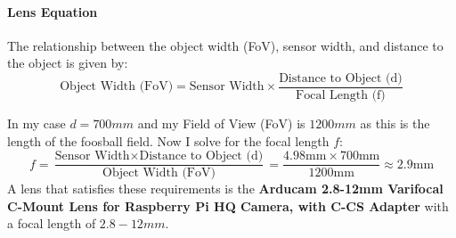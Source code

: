 \paragraph{Lens Equation}\label{par:lens_equation}

The relationship between the object width (FoV), sensor width, and distance to the object is given by:
\begin{equation}
    \text{Object Width (FoV)} = \text{Sensor Width} \times \frac{\text{Distance to Object (d)}}{\text{Focal Length (f)}}\label{eq:lens_equation}
\end{equation}


\noindent In my case $d = 700mm$ and my Field of View (FoV) is $1200mm$ as this is the length of the foosball field.
Now I solve for the focal length $f$:
\begin{equation}
    \label{eq:focal_length}
    f = \frac{\text{Sensor Width} \times \text{Distance to Object (d)}}{\text{Object Width (FoV)}} = \frac{4.98\text{mm} \times 700\text{mm}}{1200\text{mm}} \approx 2.9\text{mm}
\end{equation}
A lens that satisfies these requirements is the \textbf{Arducam 2.8-12mm Varifocal C-Mount Lens for Raspberry Pi HQ Camera, with C-CS Adapter} with a focal length of $2.8-12mm$.